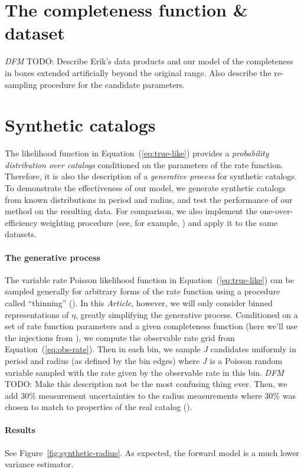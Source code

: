 \documentclass[12pt,preprint]{aastex}
\newcommand{\paper}{\emph{Article}}
\newcommand{\Fig}[1]{Figure~\ref{fig:#1}}
\newcommand{\fig}[1]{\Fig{#1}}
\newcommand{\Eq}[1]{Equation~(\ref{eq:#1})}
\newcommand{\eq}[1]{\Eq{#1}}
\newcommand{\todo}[3]{{\color{#2} \emph{#1} TODO: #3}}
\newcommand{\dfmtodo}[1]{\todo{DFM}{red}{#1}}
\newcommand{\rate}{\ensuremath{\eta}}
\begin{document}
\section{The completeness function \& dataset}

\dfmtodo{%
Describe Erik's data products and our model of the completeness in boxes
extended artificially beyond the original range.
Also describe the re-sampling procedure for the candidate parameters.
}

\section{Synthetic catalogs}

The likelihood function in \eq{true-like} provides a \emph{probability
distribution over catalogs} conditioned on the parameters of the rate
function.
Therefore, it is also the description of a \emph{generative process} for
synthetic catalogs.
To demonstrate the effectiveness of our model, we generate synthetic catalogs
from known distributions in period and radius, and test the performance of our
method on the resulting data.
For comparison, we also implement the one-over-efficiency weighting procedure
(see, for example, \citealt{howard, dressing, petigura}) and apply it to the
same datasets.

\paragraph{The generative process}
The variable rate Poisson likelihood function in \eq{true-like} can be sampled
generally for arbitrary forms of the rate function using a procedure called
``thinning'' (\citealt{poisson}).
In this \paper, however, we will only consider binned representations of
\rate, greatly simplifying the generative process.
Conditioned on a set of rate function parameters and a given completeness
function (here we'll use the injections from \citealt{petigura}), we compute
the observable rate grid from \eq{obs-rate}.
Then in each bin, we sample $J$ candidates uniformly in period and
radius (as defined by the bin edges) where $J$ is a Poisson random variable
sampled with the rate given by the observable rate in this bin.
\dfmtodo{Make this description not be the most confusing thing ever.}
Then, we add 30\% measurement uncertainties to the radius measurements where
30\% was chosen to match to properties of the real catalog
(\citealt{petigura}).

\paragraph{Results}
See \fig{synthetic-radius}.
As expected, the forward model is a much lower variance estimator.
\end{document}
